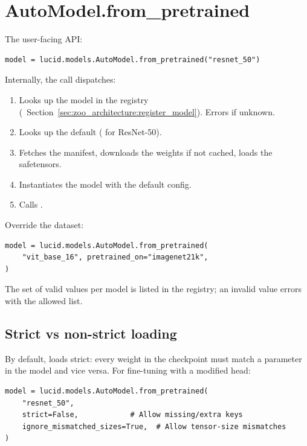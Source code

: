 \section{AutoModel.from\_pretrained}
\label{sec:pretrained:auto_model}

The user-facing API:

\begin{lstlisting}[style=lucid,language=LucidPython]
model = lucid.models.AutoModel.from_pretrained("resnet_50")
\end{lstlisting}

Internally, the call dispatches:
\begin{enumerate}
  \item Looks up the model in the registry
    (~Section~\ref{sec:zoo_architecture:register_model}).
    Errors if unknown.
  \item Looks up the default 
    ( for ResNet-50).
  \item Fetches the manifest, downloads the weights if not
    cached, loads the safetensors.
  \item Instantiates the model with the default config.
  \item Calls .
\end{enumerate}

Override the dataset:
\begin{lstlisting}[style=lucid,language=LucidPython]
model = lucid.models.AutoModel.from_pretrained(
    "vit_base_16", pretrained_on="imagenet21k",
)
\end{lstlisting}

The set of valid  values per model is
listed in the registry; an invalid value errors with the
allowed list.

\subsection{Strict vs non-strict loading}
\label{ssec:pretrained:strict_load}

By default,  loads strict: every weight
in the checkpoint must match a parameter in the model and vice
versa. For fine-tuning with a modified head:

\begin{lstlisting}[style=lucid,language=LucidPython]
model = lucid.models.AutoModel.from_pretrained(
    "resnet_50",
    strict=False,            # Allow missing/extra keys
    ignore_mismatched_sizes=True,  # Allow tensor-size mismatches
)
\end{lstlisting}

